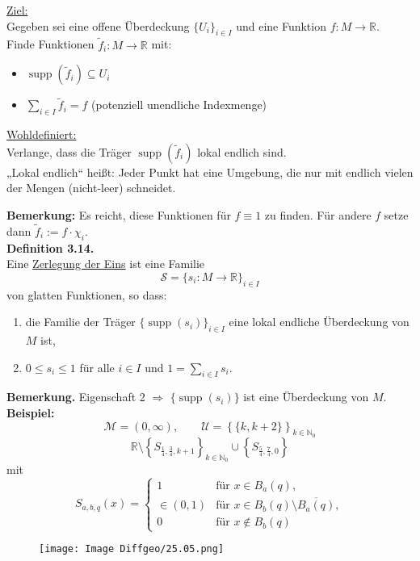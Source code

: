 \documentclass[fleqn, 12pt, letterpaper]{article}
\begin{document}
\underline{Ziel:} \\
Gegeben sei eine offene Überdeckung $\{U_i\}_{i \in I}$ und eine Funktion $f \colon M \to \mathbb{R}$. \\[0.5em]
Finde Funktionen $\tilde{f}_i \colon M \to \mathbb{R}$ mit:
\begin{itemize}
    \item $\operatorname{supp}(\tilde{f}_i) \subseteq U_i$
    \item $\displaystyle \sum_{i \in I} \tilde{f}_i = f$ \hfill (potenziell unendliche Indexmenge)
\end{itemize}

\vspace{1em}

\underline{Wohldefiniert:} \\
Verlange, dass die Träger $\operatorname{supp}(\tilde{f}_i)$ {lokal endlich} sind. \\[0.5em]
„Lokal endlich“ heißt: Jeder Punkt hat eine Umgebung, die nur mit endlich vielen der Mengen (nicht-leer) schneidet.

\vspace{1em}

\textbf{Bemerkung:} Es reicht, diese Funktionen für $f \equiv 1$ zu finden. Für andere $f$ setze dann $\tilde{f}_i := f \cdot \chi_i$.\\

\textbf{Definition 3.14.} \\
Eine \underline{Zerlegung der Eins} ist eine Familie
\[
\mathcal{S} = \{ s_i \colon M \to \mathbb{R} \}_{i \in I}
\]
von glatten Funktionen, so dass:
\begin{enumerate}
    \item die Familie der Tr\"ager $\{ \operatorname{supp}(s_i) \}_{i \in I}$ eine lokal endliche \"Uberdeckung von $M$ ist,
    \item $0 \leq s_i \leq 1$ f\"ur alle $i \in I$ und $\displaystyle 1 = \sum_{i \in I} s_i$.
\end{enumerate}
\textbf{Bemerkung.} Eigenschaft 2 $\Rightarrow$ $\{ \operatorname{supp}(s_i) \}$ ist eine \"Uberdeckung von $M$.\\

\textbf{Beispiel:}
\[
\mathcal{M} = (0, \infty), \qquad \mathcal{U} = \left\{ \{k, k+2\} \right\}_{k \in \mathbb{N}_0}
\]
\[
\mathbb{R} \setminus \left\{ S_{\frac{1}{4}, \frac{3}{4}, k+1} \right\}_{k \in \mathbb{N}_0}
\cup \left\{ S_{\frac{5}{4}, \frac{7}{4}, 0} \right\}
\]
mit
\[
S_{a,b,q}(x) =
\begin{cases}
1 & \text{für } x \in B_a(q), \\
\in (0,1) & \text{für } x \in B_b(q) \setminus \overline{B_a(q)}, \\
0 & \text{für } x \notin B_b(q)
\end{cases}
\]
      \begin{figure}[H]
    \centering
    \texttt{[image: Image Diffgeo/25.05.png]}
 \end{figure}
\end{document}
